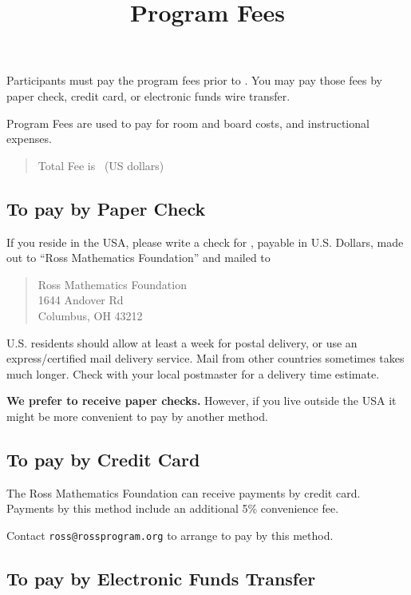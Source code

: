 \documentclass[11pt]{ross}
\title{Program Fees}
\begin{document}
\maketitle

Participants must pay the program fees prior to \feeduedate. 
You may pay those fees by paper check, credit card, or electronic funds
wire transfer.

Program Fees are used to pay for room and board costs, and instructional expenses.
\begin{quote}
Total Fee is \totalfee \ (US dollars)
\end{quote}  



\subsection*{To pay by Paper Check}

If you reside in the USA, please write a check for \totalfee, payable
in U.S. Dollars, made out to ``Ross Mathematics Foundation'' and
mailed to
\begin{quote}
Ross Mathematics Foundation  \\
1644 Andover Rd \\
Columbus, OH 43212
\end{quote}
U.S. residents should allow at least a week for postal delivery, or
use an express/certified mail delivery service. Mail from other
countries sometimes takes much longer.  Check with your local
postmaster for a delivery time estimate.

\textbf{We prefer to receive paper checks.} However, if you live
outside the USA
it might be more convenient to pay by another method.

\subsection*{To pay by Credit Card}


The Ross Mathematics Foundation can receive payments by credit card.
Payments by this method include an additional 5\% convenience fee.

Contact \texttt{ross@rossprogram.org} to arrange to pay by this
method.

\subsection*{To pay by Electronic Funds Transfer}
\end{document}
